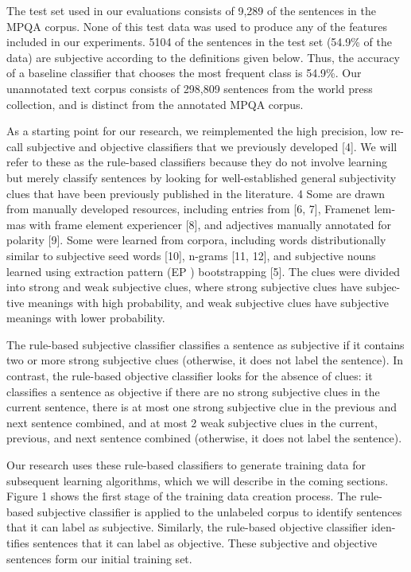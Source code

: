 The test set used in our evaluations consists of 9,289 of the
sentences in the MPQA corpus. None of this test data was used to
produce any of the features included in our experiments. 5104 of the
sentences in the test set (54.9\% of the data) are subjective
according to the definitions given below. Thus, the accuracy of a
baseline classifier that chooses the most frequent class is 54.9\%.
Our unannotated text corpus consists of 298,809 sentences from the
world press collection, and is distinct from the annotated MPQA
corpus.

As a starting point for our research, we reimplemented the high
precision, low re- call subjective and objective classifiers that we
previously developed [4]. We will refer to these as the rule-based
classifiers because they do not involve learning but merely classify
sentences by looking for well-established general subjectivity clues
that have been previously published in the literature. 4 Some are
drawn from manually developed resources, including entries from [6,
7], Framenet lem- mas with frame element experiencer [8], and
adjectives manually annotated for polarity [9]. Some were learned from
corpora, including words distributionally similar to subjective seed
words [10], n-grams [11, 12], and subjective nouns learned using
extraction pattern (EP ) bootstrapping [5]. The clues were divided
into strong and weak subjective clues, where strong subjective clues
have subjec- tive meanings with high probability, and weak subjective
clues have subjective meanings with lower probability.

The rule-based subjective classifier classifies a sentence as
subjective if it contains two or more strong subjective clues
(otherwise, it does not label the sentence). In contrast, the
rule-based objective classifier looks for the absence of clues: it
classifies a sentence as objective if there are no strong subjective
clues in the current sentence, there is at most one strong subjective
clue in the previous and next sentence combined, and at most 2 weak
subjective clues in the current, previous, and next sentence combined
(otherwise, it does not label the sentence).

Our research uses these rule-based classifiers to generate training
data for subsequent learning algorithms, which we will describe in the
coming sections.  Figure 1 shows the first stage of the training data
creation process. The rule- based subjective classifier is applied to
the unlabeled corpus to identify sentences that it can label as
subjective. Similarly, the rule-based objective classifier iden-
tifies sentences that it can label as objective. These subjective and
objective sentences form our initial training set.

